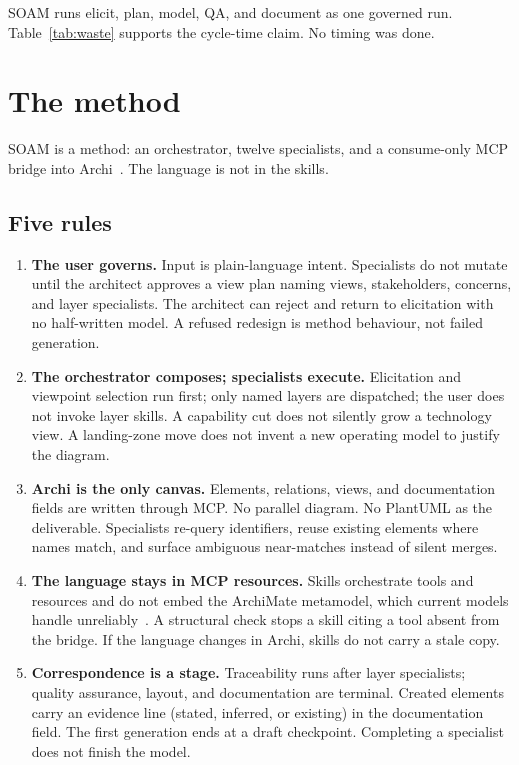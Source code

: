 \documentclass[10pt,journal,compsoc]{IEEEtran}
\begin{document}
SOAM runs elicit, plan, model, QA, and document as one governed run. Table~\ref{tab:waste} supports the cycle-time claim. No timing was done.

\section{The method}

SOAM is a method: an orchestrator, twelve specialists, and a consume-only MCP bridge into Archi~\cite{jgsarchiskills,jgsarchibridge}. The language is not in the skills.

\subsection{Five rules}

\begin{enumerate}
\item \textbf{The user governs.} Input is plain-language intent. Specialists do not mutate until the architect approves a view plan naming views, stakeholders, concerns, and layer specialists. The architect can reject and return to elicitation with no half-written model. A refused redesign is method behaviour, not failed generation.

\item \textbf{The orchestrator composes; specialists execute.} Elicitation and viewpoint selection run first; only named layers are dispatched; the user does not invoke layer skills. A capability cut does not silently grow a technology view. A landing-zone move does not invent a new operating model to justify the diagram.

\item \textbf{Archi is the only canvas.} Elements, relations, views, and documentation fields are written through MCP. No parallel diagram. No PlantUML as the deliverable. Specialists re-query identifiers, reuse existing elements where names match, and surface ambiguous near-matches instead of silent merges.

\item \textbf{The language stays in MCP resources.} Skills orchestrate tools and resources and do not embed the ArchiMate metamodel, which current models handle unreliably~\cite{muff2024}. A structural check stops a skill citing a tool absent from the bridge. If the language changes in Archi, skills do not carry a stale copy.

\item \textbf{Correspondence is a stage.} Traceability runs after layer specialists; quality assurance, layout, and documentation are terminal. Created elements carry an evidence line (stated, inferred, or existing) in the documentation field. The first generation ends at a draft checkpoint. Completing a specialist does not finish the model.
\end{enumerate}
\end{document}
